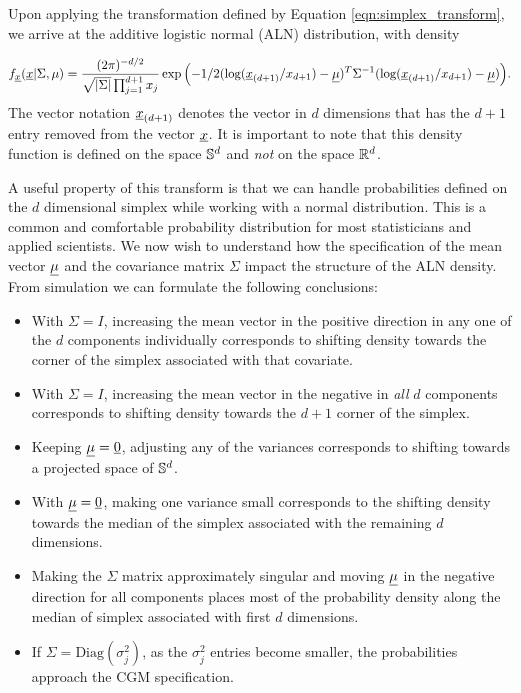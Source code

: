 Upon applying the transformation defined by Equation \ref{eqn:simplex_transform}, we arrive at the additive logistic normal (ALN) distribution, with density 

\begin{equation}
f_{\underline{x}}(\underline{x}\vert \Sigma, \mu)=\frac{(2\pi)^{-d/2}}{\sqrt{\vert\Sigma\vert}\prod_{j=1}^{d+1}x_j } 
\exp{\left(-1/2(\text{log}(\underline{x}_{(d+1)}/x_{d+1})-\underline{\mu})^T\Sigma^{-1}(\text{log}(\underline{x}_{(d+1)}/x_{d+1})-\underline{\mu})\right)}.
\end{equation}
The vector notation $\underline{x}_{(d+1)}$ denotes the vector in $d$ dimensions that has the $d+1$ entry removed from the vector $\underline{x}$. 
It is important to note that this density function is defined on the space $\mathbb{S}^{d}$ and \emph{not} on the space $\mathbb{R}^{d}$. 

A useful property of this transform is that we can handle probabilities defined on the $d$ dimensional simplex while working with a normal distribution. This is a common and comfortable probability distribution for most statisticians and applied scientists.
We now wish to understand how the specification of the mean vector $\underline{\mu}$ and the covariance matrix $\Sigma$ impact the structure of the ALN density. From simulation we can formulate the following conclusions: 

\begin{itemize}
\item With $\Sigma=I$, increasing the mean vector in the positive direction in any one of the $d$ components individually corresponds to shifting density towards the corner of the simplex associated with that covariate. 
\item With $\Sigma=I$, increasing the mean vector in the negative in \emph{all} $d$ components corresponds to shifting density towards the $d+1$ corner of the simplex. 
\item Keeping $\underline{\mu} =\underline{{0}}$, adjusting any of the variances corresponds to shifting towards a projected space of $\mathbb{S}^{d}$. 
\item With $\underline{\mu} =\underline{{0}}$, making one variance small corresponds to the shifting density towards the median of the simplex associated with the remaining $d$ dimensions. 
\item Making the $\Sigma$ matrix approximately singular and moving $\underline{\mu}$ in the negative direction for all components places most of the probability density along the median of simplex associated with first $d$ dimensions. 
\item If $\Sigma = \text{Diag}(\sigma^2_j)$, as the $\sigma^2_j$ entries become smaller, the probabilities approach the CGM specification.    
\end{itemize}

